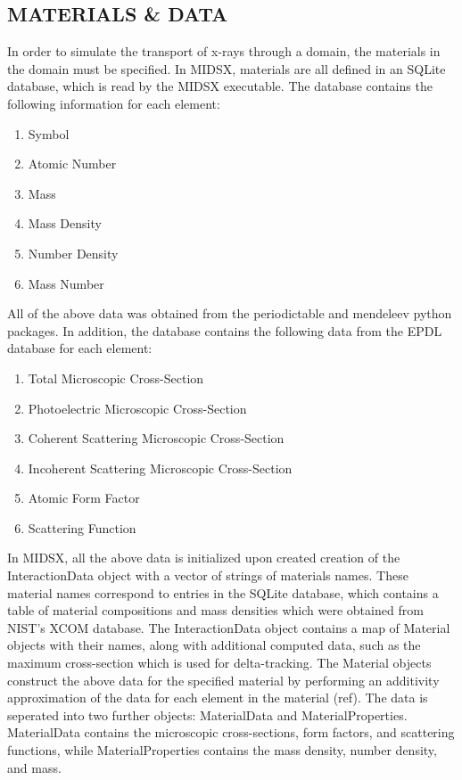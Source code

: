 \subsection{MATERIALS \& DATA}
\par In order to simulate the transport of x-rays through a domain, the materials in the domain must be specified. In MIDSX, materials are all defined in an SQLite database, which is read by the MIDSX executable. The database contains the following information for each element:

\begin{enumerate}
    \item Symbol
    \item Atomic Number
    \item Mass
    \item Mass Density
    \item Number Density
    \item Mass Number
\end{enumerate}

All of the above data was obtained from the periodictable and mendeleev python packages. In addition, the database contains the following data from the EPDL database for each element:

\begin{enumerate}
    \item Total Microscopic Cross-Section
    \item Photoelectric Microscopic Cross-Section
    \item Coherent Scattering Microscopic Cross-Section
    \item Incoherent Scattering Microscopic Cross-Section
    \item Atomic Form Factor
    \item Scattering Function
\end{enumerate}

\par In MIDSX, all the above data is initialized upon created creation of the InteractionData object with a vector of strings of materials names. These material names correspond to entries in the SQLite database, which contains a table of material compositions and mass densities which were obtained from NIST's XCOM database. The InteractionData object contains a map of Material objects with their names, along with additional computed data, such as the maximum cross-section which is used for delta-tracking. The Material objects construct the above data for the specified material by performing an additivity approximation of the data for each element in the material (ref). The data is seperated into two further objects: MaterialData and MaterialProperties. MaterialData contains the microscopic cross-sections, form factors, and scattering functions, while MaterialProperties contains the mass density, number density, and mass.

